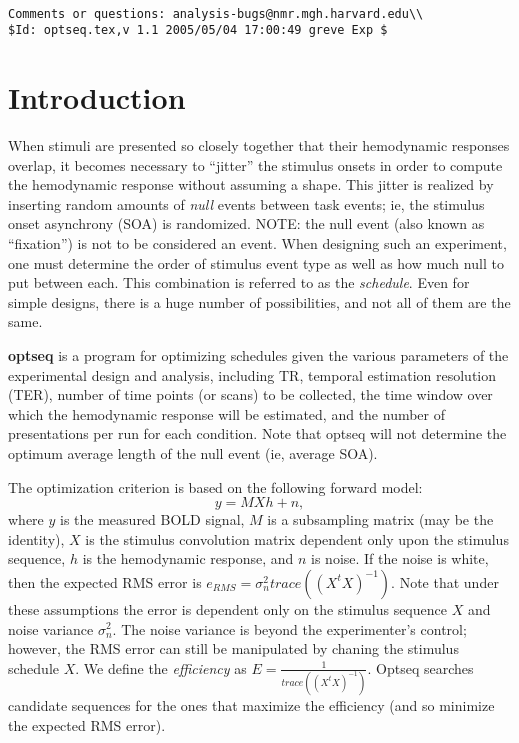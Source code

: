 \documentclass[10pt]{article}
\begin{document}
\begin{Large}
 \\
\end{Large}

\noindent 
\begin{verbatim}
Comments or questions: analysis-bugs@nmr.mgh.harvard.edu\\
$Id: optseq.tex,v 1.1 2005/05/04 17:00:49 greve Exp $
\end{verbatim}

\section{Introduction}

When stimuli are presented so closely together that their hemodynamic
responses overlap, it becomes necessary to ``jitter'' the stimulus
onsets in order to compute the hemodynamic response without assuming a
shape. This jitter is realized by inserting random amounts of {\em
null} events between task events; ie, the stimulus onset asynchrony
(SOA) is randomized. NOTE: the null event (also known as ``fixation'')
is not to be considered an event. When designing such an experiment,
one must determine the order of stimulus event type as well as how
much null to put between each. This combination is referred to as the
{\em schedule}. Even for simple designs, there is a huge number of
possibilities, and not all of them are the same. 

{\bf optseq} is a program for optimizing schedules given the various
parameters of the experimental design and analysis, including TR,
temporal estimation resolution (TER), number of time points (or scans)
to be collected, the time window over which the hemodynamic response
will be estimated, and the number of presentations per run for each
condition. Note that optseq will not determine the optimum average
length of the null event (ie, average SOA). 

The optimization criterion is based on the following forward model:
\begin{equation}
y = M X h + n,
\label{fmrix.eqn}
\end{equation}
where $y$ is the measured BOLD signal, $M$ is a subsampling matrix
(may be the identity), $X$ is the stimulus convolution matrix
dependent only upon the stimulus sequence, $h$ is the hemodynamic
response, and $n$ is noise.  If the noise is white, then the expected
RMS error is $e_{RMS} = \sigma_n^2 trace((X^t X)^{-1})$.  Note that
under these assumptions the error is dependent only on the stimulus
sequence $X$ and noise variance $\sigma_n^2$.  The noise variance is
beyond the experimenter's control; however, the RMS error can still be
manipulated by chaning the stimulus schedule $X$.  We define the {\em
efficiency} as $E = \frac{1}{trace((X^t X)^{-1})}$. Optseq
searches candidate sequences for the ones that maximize the efficiency
(and so minimize the expected RMS error).\\
\end{document}
